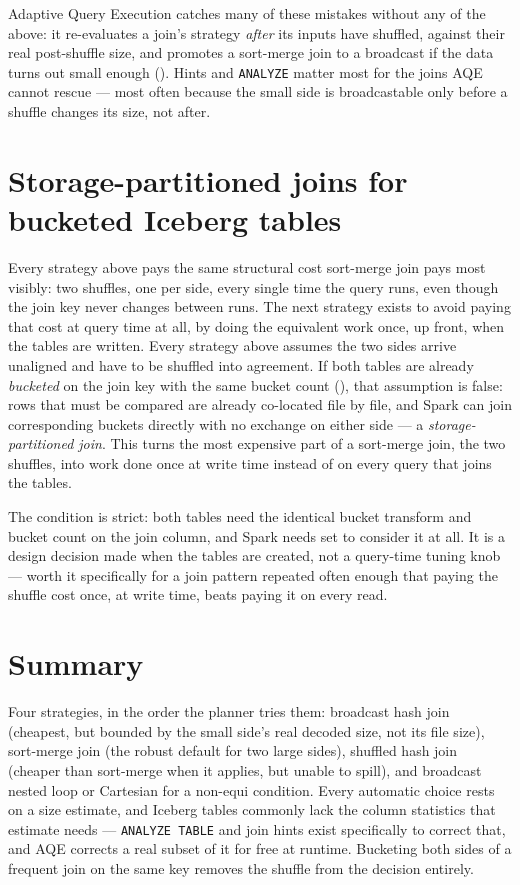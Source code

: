 \begin{tip}
Adaptive Query Execution catches many of these mistakes without any of the
above: it re-evaluates a join's strategy \emph{after} its inputs have shuffled,
against their real post-shuffle size, and promotes a sort-merge join to a
broadcast if the data turns out small enough (). Hints and
\texttt{ANALYZE} matter most for the joins AQE cannot rescue --- most often
because the small side is broadcastable only before a shuffle changes its
size, not after.
\end{tip}

\section{Storage-partitioned joins for bucketed Iceberg tables}
\label{sec:joins-spj}

Every strategy above pays the same structural cost sort-merge join pays most
visibly: two shuffles, one per side, every single time the query runs, even
though the join key never changes between runs. The next strategy exists to
avoid paying that cost at query time at all, by doing the equivalent work
once, up front, when the tables are written. Every strategy above assumes
the two sides arrive unaligned and have to be shuffled into agreement. If both tables are already \emph{bucketed} on the join
key with the same bucket count (), that assumption is
false: rows that must be compared are already co-located file by file, and
Spark can join corresponding buckets directly with no exchange on either
side --- a \emph{storage-partitioned join}. This turns the most expensive part
of a sort-merge join, the two shuffles, into work done once at write time
instead of on every query that joins the tables.

The condition is strict: both tables need the identical bucket transform and
bucket count on the join column, and Spark needs
 set to consider it at all. It is
a design decision made when the tables are created, not a query-time tuning
knob --- worth it specifically for a join pattern repeated often enough that
paying the shuffle cost once, at write time, beats paying it on every read.

\section{Summary}
\label{sec:joins-summary}

Four strategies, in the order the planner tries them: broadcast hash join
(cheapest, but bounded by the small side's real decoded size, not its file
size), sort-merge join (the robust default for two large sides), shuffled hash
join (cheaper than sort-merge when it applies, but unable to spill), and
broadcast nested loop or Cartesian for a non-equi condition. Every automatic
choice rests on a size estimate, and Iceberg tables commonly lack the
column statistics that estimate needs --- \texttt{ANALYZE TABLE} and join hints
exist specifically to correct that, and AQE corrects a real subset of it for
free at runtime. Bucketing both sides of a frequent join on the same key
removes the shuffle from the decision entirely.


